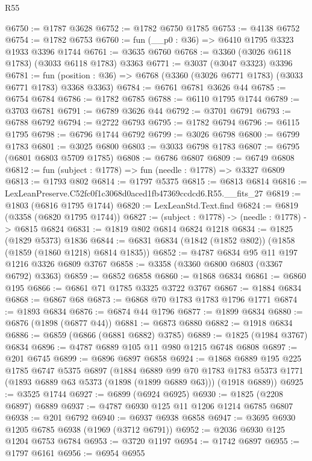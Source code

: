 \begin{lexlean}{R55}
\begin{coremodule}
@6750 := @1787 @3628
@6752 := @1782 @6750 @1785
@6753 := @4138 @6752
@6754 := @1782 @6753
@6760 := fun (__p0 : @36) => @6410 @1795 @3323 @1933 @3396 @1744
@6761 := @3635 @6760
@6768 := @3360 (@3026 @6118 @1783) (@3033 @6118 @1783) @3363
@6771 := @3037 (@3047 @3323) @3396
@6781 := fun (position : @36) => @6768 (@3360 (@3026 @6771 @1783) (@3033 @6771 @1783) @3368 @3363)
@6784 := @6761 @6781 @3626 @44
@6785 := @6754 @6784
@6786 := @1782 @6785
@6788 := @6110 @1795 @1744
@6789 := @3703 @6781
@6791 := @6789 @3626 @44
@6792 := @3701 @6791
@6793 := @6788 @6792
@6794 := @2722 @6793
@6795 := @1782 @6794
@6796 := @6115 @1795
@6798 := @6796 @1744 @6792
@6799 := @3026 @6798
@6800 := @6799 @1783
@6801 := @3025 @6800
@6803 := @3033 @6798 @1783
@6807 := @6795 (@6801 @6803 @5709 @1785)
@6808 := @6786 @6807
@6809 := @6749 @6808
@6812 := fun (subject : @1778) => fun (needle : @1778) => @3327 @6809
@6813 := @1793 @802
@6814 := @1797 @5375
@6815 := @6813 @6814
@6816 := LexLeanPreserve.C52fc0f1c3068d0aced1fb47369ccdcd6.R55.__fits_27
@6819 := @1803 (@6816 @1795 @1744)
@6820 := LexLeanStd.Text.find
@6824 := @6819 (@3358 (@6820 @1795 @1744))
@6827 := (subject : @1778) -> (needle : @1778) -> @6815 @6824
@6831 := @1819 @802 @6814 @6824 @1218
@6834 := @1825 (@1829 @5373) @1836
@6844 := @6831 @6834 (@1842 (@1852 @802)) (@1858 (@1859 (@1860 @1218) @6814 @1835))
@6852 := @4787 @6834 @95 @11 @197 @1216 @3326 @6809 @3767
@6858 := @3358 (@3360 @6800 @6803 (@3367 @6792) @3363)
@6859 := @6852 @6858
@6860 := @1868 @6834
@6861 := @6860 @195
@6866 := @6861 @71 @1785 @3325 @3722 @3767
@6867 := @1884 @6834
@6868 := @6867 @68
@6873 := @6868 @70 @1783 @1783 @1796 @1771
@6874 := @1893 @6834
@6876 := @6874 @44 @1796
@6877 := @1899 @6834
@6880 := @6876 (@1898 (@6877 @44))
@6881 := @6873 @6880
@6882 := @1918 @6834
@6886 := @6859 (@6866 (@6881 @6882) @3785)
@6889 := @1825 (@1984 @3767) @6834
@6896 := @4787 @6889 @105 @11 @980 @1215 @6748 @6808
@6897 := @201 @6745
@6899 := @6896 @6897 @6858
@6924 := @1868
    @6889
    @195
    @225
    @1785
    @6747
    @5375
    @6897
    (@1884
      @6889
      @99
      @70
      @1783
      @1783
      @5373
      @1771
      (@1893 @6889 @63 @5373 (@1898 (@1899 @6889 @63)))
      (@1918 @6889))
@6925 := @3525 @1744
@6927 := @6899 (@6924 @6925)
@6930 := @1825 (@2208 @6897) @6889
@6937 := @4787 @6930 @125 @11 @1206 @1214 @6785 @6807
@6938 := @201 @6792
@6940 := @6937 @6938 @6858
@6947 := @3695 @6930 @1205 @6785 @6938 (@1969 (@3712 @6791))
@6952 := @2036 @6930 @125 @1204 @6753 @6784
@6953 := @3720 @1197
@6954 := @1742 @6897
@6955 := @1797 @6161
@6956 := @6954 @6955

\end{coremodule}
\end{lexlean}
